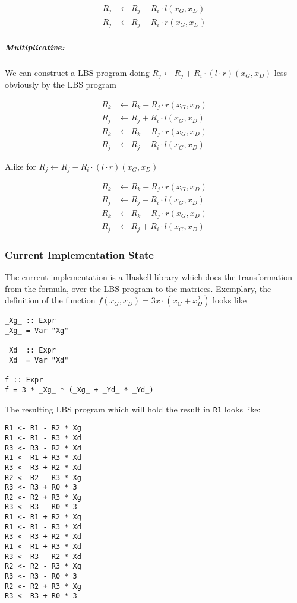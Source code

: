 \documentclass[12pt, a4paper]{article}
\begin{document}
\begin{align*}
R_j & \leftarrow R_j - R_i \cdot l(x_G, x_D) \\
R_j & \leftarrow R_j - R_i \cdot r(x_G, x_D)
\end{align*}


\subparagraph{Multiplicative:} We can construct a LBS program doing $R_j
\leftarrow R_j + R_i \cdot (l \cdot r)(x_G, x_D)$ less obviously by the LBS
program

\begin{align*}
R_k & \leftarrow R_k - R_j \cdot r(x_G, x_D) \\
R_j & \leftarrow R_j + R_i \cdot l(x_G, x_D) \\
R_k & \leftarrow R_k + R_j \cdot r(x_G, x_D) \\
R_j & \leftarrow R_j - R_i \cdot l(x_G, x_D)
\end{align*}

Alike for $R_j \leftarrow R_j - R_i \cdot (l \cdot r)(x_G, x_D)$

\begin{align*}
R_k & \leftarrow R_k - R_j \cdot r(x_G, x_D) \\
R_j & \leftarrow R_j - R_i \cdot l(x_G, x_D) \\
R_k & \leftarrow R_k + R_j \cdot r(x_G, x_D) \\
R_j & \leftarrow R_j + R_i \cdot l(x_G, x_D)
\end{align*}


\subsubsection{Current Implementation State}

The current implementation is a Haskell library which does the transformation
from the formula, over the LBS program to the matrices. Exemplary,
the definition of the function $f(x_G,x_D) = 3x \cdot (x_G + x_D^2)$ looks like

\lstset{language=Haskell}

\begin{lstlisting}
_Xg_ :: Expr
_Xg_ = Var "Xg"

_Xd_ :: Expr
_Xd_ = Var "Xd"

f :: Expr
f = 3 * _Xg_ * (_Xg_ + _Yd_ * _Yd_)
\end{lstlisting}

\noindent{}The resulting LBS program which will hold the result in \texttt{R1}
looks like:

\begin{lstlisting}
R1 <- R1 - R2 * Xg
R1 <- R1 - R3 * Xd
R3 <- R3 - R2 * Xd
R1 <- R1 + R3 * Xd
R3 <- R3 + R2 * Xd
R2 <- R2 - R3 * Xg
R3 <- R3 + R0 * 3
R2 <- R2 + R3 * Xg
R3 <- R3 - R0 * 3
R1 <- R1 + R2 * Xg
R1 <- R1 - R3 * Xd
R3 <- R3 + R2 * Xd
R1 <- R1 + R3 * Xd
R3 <- R3 - R2 * Xd
R2 <- R2 - R3 * Xg
R3 <- R3 - R0 * 3
R2 <- R2 + R3 * Xg
R3 <- R3 + R0 * 3
\end{lstlisting}
\end{document}
